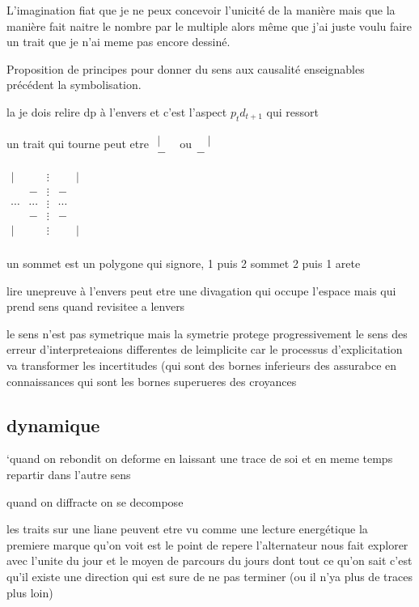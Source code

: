 \documentclass{article}
\begin{document}
 L'imagination fiat que je ne peux concevoir l'unicité de la manière mais que la manière fait naitre le nombre par le multiple alors même que j'ai juste voulu faire 
 un trait que je n'ai meme pas encore dessiné.
 
 
  Proposition de principes pour donner du sens aux  causalité enseignables précédent la symbolisation.
  



la je dois relire dp à l'envers et c'est l'aspect $p_td_{t+1}$  qui ressort
 
un trait qui tourne peut etre $\begin{matrix} |\quad \\ -\end{matrix}$ ou$\begin{matrix} \quad | \\ -\end{matrix}$ 

$\begin{matrix} 
	    | & & \vdots && |\\
 	       &-&\vdots &-&\\
	\cdots&\cdots&\vdots&\cdots \\
	 	       &-&\vdots &-&\\
	    | & & \vdots && |\\
	\end{matrix}$ 


un sommet est un polygone qui signore, 1 puis 2 sommet  2 puis 1 arete 

lire unepreuve à l'envers peut etre  une divagation qui occupe l'espace  mais qui prend sens quand revisitee a lenvers

le sens n'est pas symetrique mais la symetrie protege progressivement le sens des  erreur d'interpreteaions differentes de leimplicite 
car le processus d'explicitation va transformer les incertitudes (qui sont des bornes inferieurs des assurabce en connaissances qui sont les bornes superueres des croyances
  

  
  
  \subsection{dynamique}
  
  `quand on rebondit on deforme en laissant une trace de soi  et en meme temps repartir dans l'autre sens
  
  quand on diffracte  on se decompose


les traits sur une liane peuvent etre vu comme une lecture energétique la premiere marque qu'on voit est le point de repere 
l'alternateur nous fait explorer avec l'unite du jour  et le moyen de parcours du jours dont tout ce qu'on sait c'est qu'il existe une direction qui est sure de ne pas terminer 
(ou il n'ya plus de traces plus loin)
\end{document}
